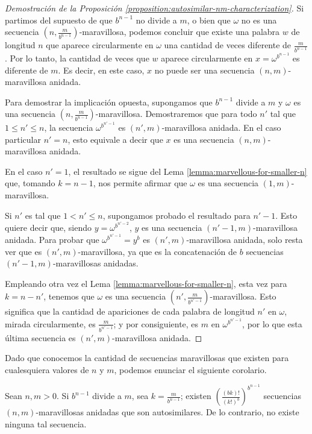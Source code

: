 \begin{proof}[Demostración de la Proposición \ref{proposition:autosimilar-nm-characterization}]
	Si partimos del supuesto de que $b^{n-1}$ no divide a $m$, o bien que
	$\omega$ no es una secuencia $\left( n, \frac{m}{b^{n-1}}
		\right)$-maravillosa,
	podemos concluir que existe una palabra $w$ de longitud $n$ que aparece
	circularmente en $\omega$ una cantidad de veces diferente de
	$\frac{m}{b^{n-1}}$.
	Por lo tanto, la cantidad de veces que $w$ aparece circularmente
	en $x = \omega^{b^{n-1}}$ es diferente de $m$.
	Es decir, en este caso, $x$ no puede ser una secuencia $(n,m)$-maravillosa
	anidada.

	Para demostrar la implicación opuesta, supongamos que $b^{n-1}$ divide a $m$
	y $\omega$ es una secuencia $\left(n, \frac{m}{b^{n-1}} \right)$-maravillosa.
	Demostraremos que para todo $n'$ tal que $1 \leq n' \leq n$, la secuencia
	$\omega^{b^{n'-1}}$ es $(n',m)$-maravillosa anidada.
	En el caso particular $n' = n$, esto equivale a decir que $x$ es una secuencia
	$(n,m)$-maravillosa anidada.

	En el caso $n' = 1$, el resultado se sigue del Lema
	\ref{lemma:marvellous-for-smaller-n} que, tomando $k = n-1$, nos permite
	afirmar que $\omega$ es una secuencia $(1,m)$-maravillosa.

	Si $n'$ es tal que $1 < n' \leq n$, supongamos probado el resultado para
	$n'-1$.
	Esto quiere decir que, siendo $y = \omega^{b^{n' - 2}}$, $y$ es una secuencia
	$(n'-1, m)$-maravillosa anidada.
	Para probar que $\omega^{b^{n' - 1}} = y^b$ es $(n',m)$-maravillosa anidada,
	solo resta ver que es $(n',m)$-maravillosa, ya que es la concatenación de $b$
	secuencias $(n'-1, m)$-maravillosas anidadas.

	Empleando otra vez el Lema \ref{lemma:marvellous-for-smaller-n}, esta vez para
	$k = n - n'$, tenemos que $\omega$ es una secuencia $\left( n', \frac{m}{b^{n'
				- 1}} \right)$-maravillosa.
	Esto significa que la cantidad de apariciones de cada palabra de longitud $n'$
	en $\omega$, mirada circularmente, es $\frac{m}{b^{n' - 1}}$; y por
	consiguiente, es $m$ en $\omega^{b^{n'-1}}$, por lo que esta última secuencia
	es $(n',m)$-maravillosa anidada.
\end{proof}

Dado que conocemos la cantidad de secuencias maravillosas que existen para
cualesquiera valores de $n$ y $m$, podemos enunciar el siguiente corolario.

\begin{corollary} \label{corollary:autosimilar-nm-count}
	Sean $n, m > 0$.
	Si $b^{n-1}$ divide a $m$, sea $k = \frac{m}{b^{n-1}}$; existen
	$\left( \frac{(bk)! }{(k!)^b} \right)^{b^{n-1}}$
	secuencias $(n,m)$-maravillosas anidadas que son autosimilares.
	De lo contrario, no existe ninguna tal secuencia.
\end{corollary}

